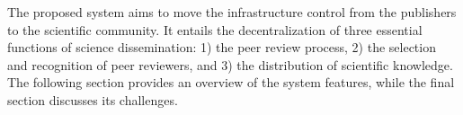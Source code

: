 The proposed system aims to move the infrastructure control from the publishers
to the scientific community. It entails the decentralization of three essential
functions of science dissemination: 1) the peer review process, 2) the selection
and recognition of peer reviewers, and 3) the distribution of scientific
knowledge. The following section provides an overview of the system features,
while the final section discusses its challenges.
